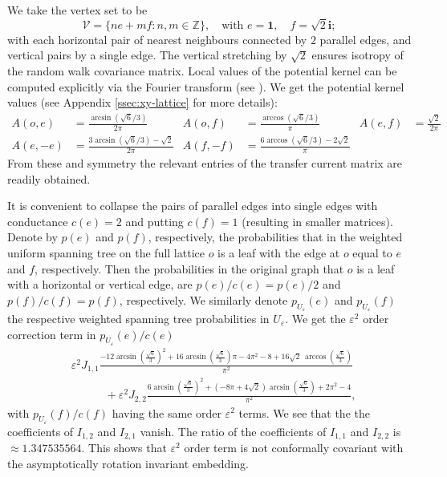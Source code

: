 \documentclass[11pt]{article}
\theoremstyle{remark}
\def\eps{\varepsilon}
\def\Z{\mathbb{Z}}
\def\cV{\mathcal{V}}
\newcommand{\eqnst}[1]{\begin{equation*}#1\end{equation*}}
\newcommand{\eqnsplst}[1]{\begin{equation*}\begin{split}%
   #1\end{split}\end{equation*}}
\begin{document}
We take the vertex set to be
\eqnst{
  \cV 
  = \{ n e + m f : \text{$n, m \in \Z$} \}, \quad \text{with } e = \mathbf{1}, \quad
    f = \sqrt{2} \mathbf{i}; }
with each horizontal pair of nearest neighbours connected by $2$ parallel edges, and vertical pairs
by a single edge. The vertical stretching by $\sqrt{2}$ ensures isotropy of the random walk covariance matrix.
Local values of the potential kernel can be computed explicitly via the Fourier transform 
(see \cite{Sp-book,KW16}). 
We get the potential kernel values (see Appendix \ref{ssec:xy-lattice} for more details):
\begin{align*}
  A(o,e) &= \frac{\arcsin(\sqrt{6}/3)}{2 \pi} &
  A(o,f) &= \frac{\arccos(\sqrt{6}/3)}{\pi} & 
  A(e,f) &= \frac{\sqrt{2}}{2 \pi} \\
  A(e,-e) &= \frac{3 \arcsin(\sqrt{6}/3) - \sqrt{2}}{2\pi} & 
  A(f,-f) &= \frac{6 \arccos(\sqrt{6}/3) - 2\sqrt{2}}{\pi} &
\end{align*}
From these and symmetry the relevant entries of the transfer current matrix are readily obtained.

It is convenient to collapse the pairs of parallel edges into single edges with conductance 
$c(e) = 2$ and putting $c(f) = 1$ (resulting in smaller matrices). Denote by $p(e)$ and $p(f)$,
respectively, the probabilities that in the weighted uniform spanning tree on the full lattice 
$o$ is a leaf with the edge at $o$ equal to $e$ and $f$, respectively. Then the probabilities 
in the original graph that $o$ is a leaf with a horizontal or vertical edge, are 
$p(e)/c(e) = p(e)/2$ and $p(f)/c(f) = p(f)$, respectively. We similarly denote 
$p_{U_\eps}(e)$ and $p_{U_\eps}(f)$ the respective weighted spanning tree probabilities 
in $U_\eps$. We get the $\eps^2$ order correction term in $p_{U_\eps}(e)/c(e)$
\eqnsplst{
 &\eps^2 J_{1,1} 
   \frac{-12 \arcsin\! \left(\frac{\sqrt{6}}{3}\right)^{2}+16 \arcsin\! \left(\frac{\sqrt{6}}{3}\right) \pi -4 \pi^{2}-8+16 \sqrt{2}\, \arccos\! \left(\frac{\sqrt{6}}{3}\right)}{\pi^{2}} \\
 &\qquad\quad + \eps^2 J_{2,2} \frac{6 \arcsin\! \left(\frac{\sqrt{6}}{3}\right)^{2}+\left(-8 \pi +4 \sqrt{2}\right) \arcsin\! \left(\frac{\sqrt{6}}{3}\right)+2 \pi^{2}-4}{\pi^{2}}, }
with $p_{U_\eps}(f)/c(f)$ having the same order $\eps^2$ terms. We see that the
the coefficients of $I_{1,2}$ and $I_{2,1}$ vanish.
The ratio of the coefficients of $I_{1,1}$ and $I_{2,2}$ is $\approx 1.347535564$.
This shows that $\eps^2$ order term is not conformally covariant with the asymptotically 
rotation invariant embedding.
\end{document}

